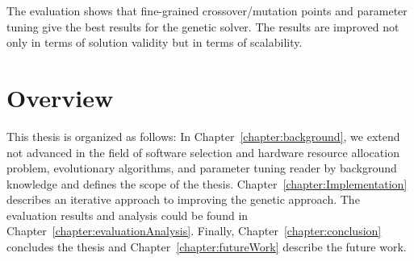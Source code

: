 The evaluation shows that fine-grained crossover/mutation points and parameter tuning give the best results for the genetic solver.
The results are improved not only in terms of solution validity but in terms of scalability.


\section{Overview}
This thesis is organized as follows: In Chapter~\ref{chapter:background}, we extend not advanced in the field of software selection and hardware resource allocation problem, evolutionary algorithms, and parameter tuning reader by background knowledge and defines the scope of the thesis. Chapter~\ref{chapter:Implementation} describes an iterative approach to improving the genetic approach. The evaluation results and analysis could be found in Chapter~\ref{chapter:evaluationAnalysis}. Finally, Chapter~\ref{chapter:conclusion} concludes the thesis and Chapter~\ref{chapter:futureWork} describe the future work.
